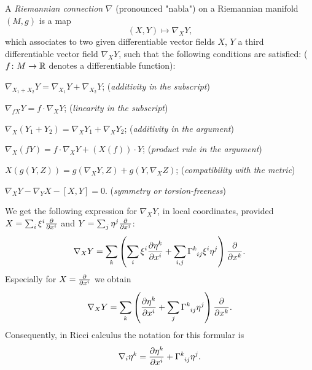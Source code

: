 \documentclass[../main.tex]{subfiles}
\begin{document}
\begin{definition}\label{Manifold:Connection}
A \textit{Riemannian connection} $\nabla$ (pronounced "nabla")
on a Riemannian manifold $\left(M,g\right)$ is a map
$$\left(X,Y\right)\mapsto\nabla_XY\text{,}$$
which associates to two given differentiable vector fields $X$, $Y$
a third differentiable vector field $\nabla_XY$,
such that the following conditions are satisfied: ($f\colon M\to\mathbb{R}$ denotes a differentiable function):
\begin{APAenumerate}
\item $\nabla_{X_1+X_2}Y=\nabla_{X_1}Y+\nabla_{X_2}Y$; (\textit{additivity in the subscript})
\item $\nabla_{fX}Y=f\cdot\nabla_{X}Y$; (\textit{linearity in the subscript})
\item $\nabla_X\left(Y_1+Y_2\right)=\nabla_XY_1+\nabla_XY_2$; (\textit{additivity in the argument})
\item $\nabla_X\left(fY\right)=f\cdot\nabla_XY+\left(X\left(f\right)\right)\cdot Y$; (\textit{product rule in the argument})
\item $X\left(g\left(Y,Z\right)\right)=g\left(\nabla_XY,Z\right)+g\left(Y,\nabla_XZ\right)$; (\textit{compatibility with the metric})
\item $\nabla_XY-\nabla_YX-\left[X,Y\right]=0$. (\textit{symmetry or torsion-freeness})
\end{APAenumerate}
\end{definition}
\begin{remark}
We get the following expression for $\nabla_XY$, in local coordinates, provided $X=\sum_i\tensor{\xi}{^i}\frac{\partial}{\partial\tensor{x}{^i}}$ and $Y=\sum_j\tensor{\eta}{^j}\frac{\partial}{\partial\tensor{x}{^j}}$:
\begin{equation*}
\nabla_XY=\sum_k\left(\sum_i\tensor{\xi}{^i}\frac{\partial\tensor{\eta}{^k}}{\partial\tensor{x}{^i}}+\sum_{i,j}\tensor{\Gamma}{^k_i_j}\tensor{\xi}{^i}\tensor{\eta}{^j}\right)\frac{\partial}{\partial\tensor{x}{^k}}\text{.}
\end{equation*}
Especially for $X=\frac{\partial}{\partial\tensor{x}{^i}}$ we obtain
\begin{equation*}
\nabla_XY=\sum_k\left(\frac{\partial\tensor{\eta}{^k}}{\partial\tensor{x}{^i}}+\sum_j\tensor{\Gamma}{^k_i_j}\tensor{\eta}{^j}\right)\frac{\partial}{\partial\tensor{x}{^k}}\text{.}
\end{equation*}
Consequently, in Ricci calculus the notation for this formular is
\begin{equation*}
\nabla_i\tensor{\eta}{^k}=\frac{\partial\tensor{\eta}{^k}}{\partial\tensor{x}{^i}}+\tensor{\Gamma}{^k_i_j}\tensor{\eta}{^j}\text{.}
\end{equation*}
\end{remark}
\end{document}
